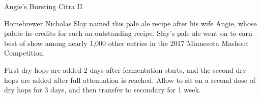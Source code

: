 \begin{recipie}{Angie's Bursting Citra II}

\begin{aboutblock}
Homebrewer Nicholas Slay named this pale ale recipe after his wife Angie, whose
palate he credits for such an outstanding recipe. Slay's pale ale went on to earn
best of show among nearly 1,000 other entries in the 2017 Minnesota Mashout
Competition. 
\end{aboutblock}


\begin{methodandtiming}
 
\begin{mashsteps}
\end{mashsteps}

\begin{fermentationsteps}
\end{fermentationsteps}

\begin{directions}
First dry hops are added 2 days after fermentation starts, and the
second dry hops are added after full attenuation is reached. Allow
to sit on a second dose of dry hops for 3 days, and then transfer to
secondary for 1 week.
\end{directions}

\end{methodandtiming}

\pagebreak

\begin{ingredientsblock}

\begin{malts}
\end{malts}

\begin{hops}
\end{hops}


\end{ingredientsblock}

\end{recipie}

